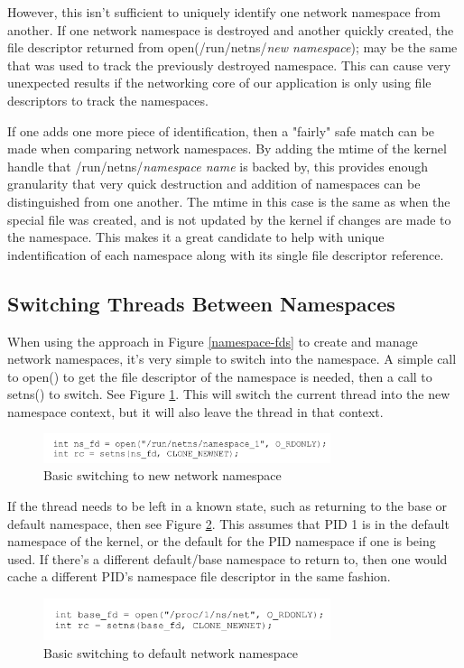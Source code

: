 \documentclass[letterpaper]{article}
\begin{document}
However, this isn't sufficient to uniquely identify one network namespace from another. If one network namespace is destroyed and another quickly created, the file descriptor returned from open(/run/netns/\textit{new namespace}); may be the same that was used to track the previously destroyed namespace. This can cause very unexpected results if the networking core of our application is only using file descriptors to track the namespaces.

If one adds one more piece of identification, then a "fairly" safe match can be made when comparing network namespaces. By adding the mtime of the kernel handle that /run/netns/\textit{namespace name} is backed by, this provides enough granularity that very quick destruction and addition of namespaces can be distinguished from one another. The mtime in this case is the same as when the special file was created, and is not updated by the kernel if changes are made to the namespace. This makes it a great candidate to help with unique indentification of each namespace along with its single file descriptor reference.

\subsection{Switching Threads Between Namespaces}
When using the approach in Figure \ref{namespace-fds} to create and manage network namespaces, it's very simple to switch into the namespace. A simple call to open() to get the file descriptor of the namespace is needed, then a call to setns() to switch. See Figure \ref{switch-new-namespace}. This will switch the current thread into the new namespace context, but it will also leave the thread in that context.
\begin{figure}[h]
\includegraphics[width=3.31in]{switch-new-namespace.png}
\caption{Basic switching to new network namespace}
\label{switch-new-namespace}
\end{figure}

If the thread needs to be left in a known state, such as returning to the base or default namespace, then see Figure \ref{switch-base-namespace}. This assumes that PID 1 is in the default namespace of the kernel, or the default for the PID namespace if one is being used. If there's a different default/base namespace to return to, then one would cache a different PID's namespace file descriptor in the same fashion.
\begin{figure}[h]
\includegraphics[width=3.31in]{switch-base-namespace.png}
\caption{Basic switching to default network namespace}
\label{switch-base-namespace}
\end{figure}
\end{document}
